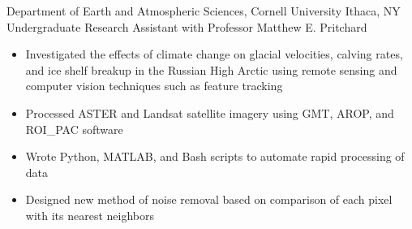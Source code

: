 
        {Department of Earth and Atmospheric Sciences, Cornell University}
        {Ithaca, NY}
        {Undergraduate Research Assistant}
        {with Professor Matthew E. Pritchard}{
    \begin{itemize}
        \item Investigated the effects of climate change on glacial velocities, calving rates, and
            ice shelf breakup in the Russian High Arctic using remote sensing and computer vision techniques such as feature tracking
        \item Processed ASTER and Landsat satellite imagery using GMT, AROP, and ROI\_PAC software
        \item Wrote Python, MATLAB, and Bash scripts to automate rapid processing of data
        \item Designed new method of noise removal based on comparison of each pixel with its nearest neighbors
    \end{itemize}
}
